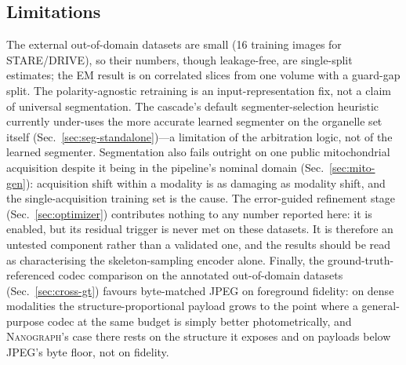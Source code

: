 \documentclass[10pt,a4paper]{article}
\newcommand{\method}{\textnormal{\textsc{Nanograph}}\xspace}
\begin{document}
\subsection{Limitations}
The external out-of-domain datasets are small (16 training images for
STARE/DRIVE), so their numbers, though leakage-free, are single-split
estimates; the EM result is on correlated slices from one volume with a
guard-gap split. The polarity-agnostic retraining is an
input-representation fix, not a claim of universal segmentation. The
cascade's default segmenter-selection heuristic currently under-uses the more
accurate learned segmenter on the organelle set itself
(Sec.~\ref{sec:seg-standalone})---a limitation of the arbitration logic, not
of the learned segmenter. Segmentation also fails outright on one public
mitochondrial acquisition despite it being in the pipeline's nominal domain
(Sec.~\ref{sec:mito-gen}): acquisition shift within a modality is as
damaging as modality shift, and the single-acquisition training set is the
cause.
The error-guided refinement stage (Sec.~\ref{sec:optimizer}) contributes
nothing to any number reported here: it is enabled, but its residual trigger
is never met on these datasets. It is therefore an untested component rather
than a validated one, and the results should be read as characterising the
skeleton-sampling encoder alone. Finally, the ground-truth-referenced codec
comparison on the annotated out-of-domain datasets (Sec.~\ref{sec:cross-gt})
favours byte-matched JPEG on foreground fidelity: on dense modalities the
structure-proportional payload grows to the point where a general-purpose
codec at the same budget is simply better photometrically, and \method's
case there rests on the structure it exposes and on payloads below JPEG's
byte floor, not on fidelity.
\end{document}
